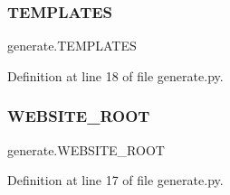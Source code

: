 \subsubsection{\texorpdfstring{T\+E\+M\+P\+L\+A\+T\+ES}{TEMPLATES}}
{\footnotesize\ttfamily generate.\+T\+E\+M\+P\+L\+A\+T\+ES}



Definition at line 18 of file generate.\+py.

\mbox{\label{namespacegenerate_a3cb5a2707122c53bf81da4c33e3f65c4}} 
\subsubsection{\texorpdfstring{W\+E\+B\+S\+I\+T\+E\+\_\+\+R\+O\+OT}{WEBSITE\_ROOT}}
{\footnotesize\ttfamily generate.\+W\+E\+B\+S\+I\+T\+E\+\_\+\+R\+O\+OT}



Definition at line 17 of file generate.\+py.


